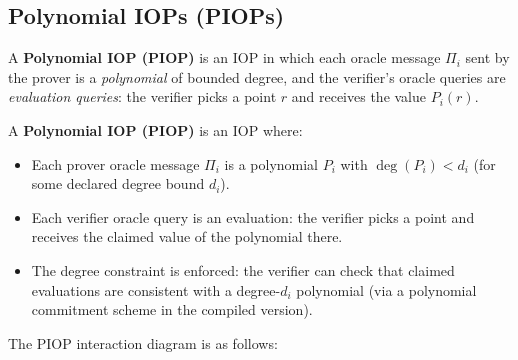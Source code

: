 \documentclass[11pt]{article}
\begin{document}
\subsection{Polynomial IOPs (PIOPs)}

A \textbf{Polynomial IOP (PIOP)} is an IOP in which each oracle message $\Pi_i$
sent by the prover is a \emph{polynomial} of bounded degree, and the verifier's
oracle queries are \emph{evaluation queries}: the verifier picks a point $r$ and
receives the value $P_i(r)$.

\begin{defbox}
A \textbf{Polynomial IOP (PIOP)} is an IOP where:
\begin{itemize}
  \item Each prover oracle message $\Pi_i$ is a polynomial $P_i$ with
    $\deg(P_i) < d_i$ (for some declared degree bound $d_i$).
  \item Each verifier oracle query is an evaluation: the verifier picks a point
    and receives the claimed value of the polynomial there.
  \item The degree constraint is enforced: the verifier can check that claimed
    evaluations are consistent with a degree-$d_i$ polynomial (via a polynomial
    commitment scheme in the compiled version).
\end{itemize}
\end{defbox}

The PIOP interaction diagram is as follows:
\end{document}
